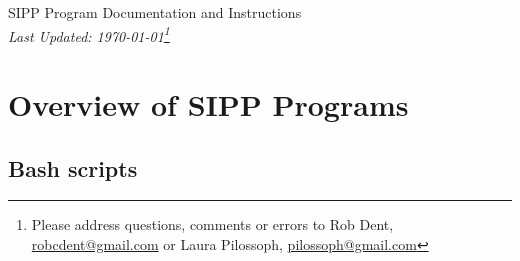 \documentclass{article}
\begin{document}
\begin{center}
{\large \sc SIPP Program Documentation and Instructions}\\
{\it Last Updated: \today\footnote{Please address questions, comments or errors to Rob Dent, \href{mailto:robcdent@gmail.com}{robcdent@gmail.com} or Laura Pilossoph, \href{mailto:pilossoph@gmail.com}{pilossoph@gmail.com}}}
\end{center}
\vspace{1in}

\newpage
\vspace{0.5in}
\section{Overview of SIPP Programs}
\subsection{Bash scripts}
\end{document}

